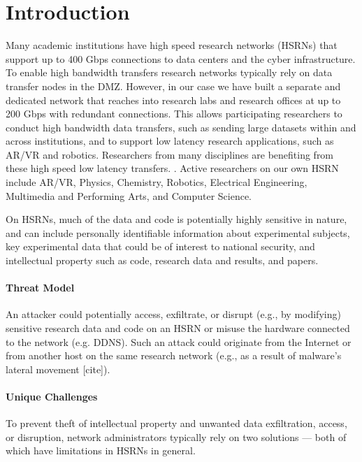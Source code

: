 \begin{center}
{\large \bf \TITLE}
\end{center}

\section{Introduction}

Many academic institutions have high speed research networks (HSRNs) that support up to 400 Gbps connections to data centers and the cyber infrastructure. To enable high bandwidth transfers research networks typically rely on data transfer nodes in the DMZ. However, in our case we have built a separate and dedicated network that reaches into research labs and research offices at up to 200 Gbps with redundant connections. This allows participating researchers to conduct high bandwidth data transfers, such as sending large datasets within and across institutions, and to support  low latency research applications, such as AR/VR and robotics. Researchers from many disciplines are benefiting from these high speed low latency transfers. . Active researchers on our own HSRN include AR/VR, Physics, Chemistry, Robotics, Electrical Engineering, Multimedia and Performing Arts, and Computer Science.

On HSRNs, much of the data and code is potentially highly sensitive in nature, and can include personally identifiable information about experimental subjects, key experimental data that could be of interest to national security, and intellectual property such as code, research data and results, and papers.

\paragraph{Threat Model}
An attacker could potentially access, exfiltrate, or disrupt (e.g., by modifying) sensitive research data and code on an HSRN or misuse the hardware connected to the network (e.g. DDNS). Such an  attack could originate from the Internet or from another host on the same research network (e.g., as a result of malware's lateral movement [cite]).

\paragraph{Unique Challenges}
To prevent theft of intellectual property and unwanted data exfiltration, access, or disruption, network administrators typically rely on two solutions — both of which have limitations in HSRNs in general.

